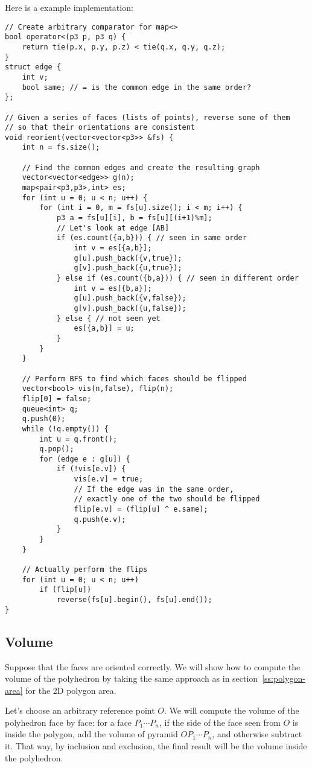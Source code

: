Here is a example implementation:
\begin{lstlisting}
// Create arbitrary comparator for map<>
bool operator<(p3 p, p3 q) {
    return tie(p.x, p.y, p.z) < tie(q.x, q.y, q.z);
}
struct edge {
    int v;
    bool same; // = is the common edge in the same order?
};

// Given a series of faces (lists of points), reverse some of them
// so that their orientations are consistent
void reorient(vector<vector<p3>> &fs) {
    int n = fs.size();
    
    // Find the common edges and create the resulting graph
    vector<vector<edge>> g(n);
    map<pair<p3,p3>,int> es;
    for (int u = 0; u < n; u++) {
        for (int i = 0, m = fs[u].size(); i < m; i++) {
            p3 a = fs[u][i], b = fs[u][(i+1)%m];
            // Let's look at edge [AB]
            if (es.count({a,b})) { // seen in same order
                int v = es[{a,b}];
                g[u].push_back({v,true});
                g[v].push_back({u,true});
            } else if (es.count({b,a})) { // seen in different order
                int v = es[{b,a}];
                g[u].push_back({v,false});
                g[v].push_back({u,false});
            } else { // not seen yet
                es[{a,b}] = u;
            }
        }
    }
    
    // Perform BFS to find which faces should be flipped
    vector<bool> vis(n,false), flip(n);
    flip[0] = false;
    queue<int> q;
    q.push(0);
    while (!q.empty()) {
        int u = q.front();
        q.pop();
        for (edge e : g[u]) {
            if (!vis[e.v]) {
                vis[e.v] = true;
                // If the edge was in the same order,
                // exactly one of the two should be flipped
                flip[e.v] = (flip[u] ^ e.same);
                q.push(e.v);
            }
        }
    }
    
    // Actually perform the flips
    for (int u = 0; u < n; u++)
        if (flip[u])
            reverse(fs[u].begin(), fs[u].end());
}
\end{lstlisting}

\subsection{Volume}
Suppose that the faces are oriented correctly. We will show how to compute the volume of the polyhedron by taking the same approach as in section~\ref{ss:polygon-area} for the 2D polygon area.

Let's choose an arbitrary reference point $O$.
We will compute the volume of the polyhedron face by face: for a face $P_1\cdots P_n$, if the side of the face seen from $O$ is inside the polygon, add the volume of pyramid $OP_1\cdots P_n$, and otherwise subtract it. That way, by inclusion and exclusion, the final result will be the volume inside the polyhedron.

